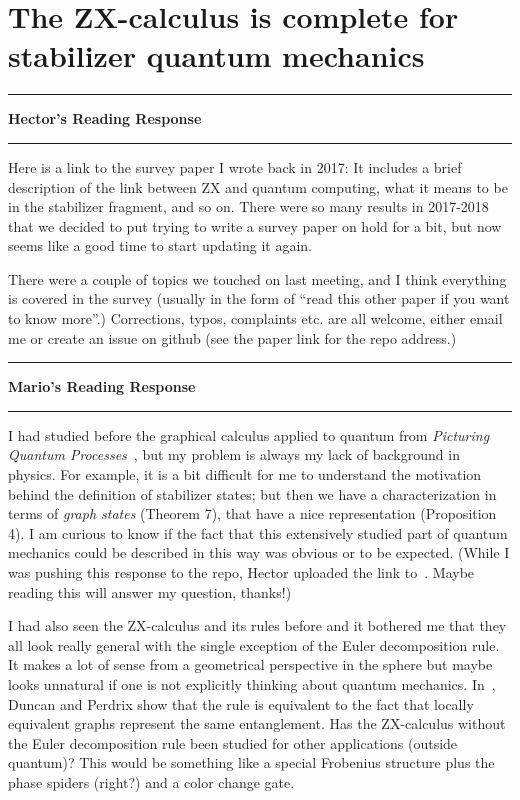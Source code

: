 \documentclass{amsart}
\newcommand{\iam}[1]{
  \vspace{0.25em}
  \hrule
  \vspace{0.25em}
  \textbf{{#1}'s Reading Response}
  \vspace{0.25em}
  \hrule
  \vspace{1em}
}
\begin{document}

\section{The ZX-calculus is complete for stabilizer quantum
  mechanics}
\label{sec:zx-calculus}

\iam{Hector}
Here is a link to the survey paper I wrote back in 2017:
It includes a brief description of the link between ZX and quantum computing,
what it means to be in the stabilizer fragment, and so on.
There were so many results in 2017-2018 that we decided to put trying to write a survey paper on hold for a bit,
but now seems like a good time to start updating it again.
\cite{HectorSurvey}

There were a couple of topics we touched on last meeting,
and I think everything is covered in the survey
(usually in the form of ``read this other paper if you want to know more''.)
Corrections, typos, complaints etc. are all welcome,
either email me or create an issue on github (see the paper link for the repo address.)

\iam{Mario}
I had studied before the graphical calculus applied to quantum from
\emph{Picturing Quantum Processes}~\cite{PQP}, but my problem is always
my lack of background in physics.  For example, it is a bit difficult
for me to understand the motivation behind the definition of
stabilizer states; but then we have a characterization in terms of
\emph{graph states} (Theorem 7), that have a nice representation
(Proposition 4). I am curious to know if the fact that this
extensively studied part of quantum mechanics could be
described in this way was obvious or to be expected.  (While I was
pushing this response to the repo, Hector uploaded the link
to~\cite{HectorSurvey}. Maybe reading this will answer my question,
thanks!)

I had also seen the ZX-calculus and its rules before and it bothered
me that they all look really general with the single exception of the
Euler decomposition rule. It makes a lot of sense from a geometrical
perspective in the sphere but maybe looks unnatural if one is not
explicitly thinking about quantum
mechanics. In~\cite{DuncanPerdrixEulerDecomposition}, Duncan and
Perdrix show that the rule is equivalent to the fact that locally
equivalent graphs represent the same entanglement. Has the ZX-calculus
without the Euler decomposition rule been studied for other
applications (outside quantum)? This would be something like a special
Frobenius structure plus the phase spiders (right?) and a color change
gate.
\end{document}
